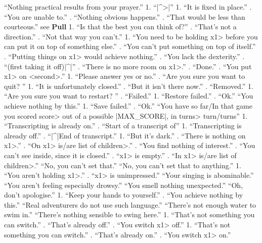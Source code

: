    ``Nothing practical results from your prayer.''
 1. ``|^>|''
  1. ``It is fixed in place.''
. ``You are unable to.''
. ``Nothing obvious happens.''
. ``That would be less than courteous.''
 see {\bf Pull}
 1. ``Is that the best you can think of?''
. ``That's not a direction.''
. ``Not that way you can't.''
  1. ``You need to be holding \<x1> before you
can put it on top of something else.''
. ``You can't put something on top of itself.''
. ``Putting things on \<x1> would achieve nothing.''
. ``You lack the dexterity.''
. ``(first taking it off)|^|''
. ``There is no more room on \<x1>.''
. ``Done.''
. ``You put \<x1> on <second>.''
   1. ``Please answer yes or no.''
. ``Are you sure you want to quit? '' 
  1. ``It is unfortunately closed.''
. ``But it isn't there now.''
. ``Removed.''
 1. ``Are you sure you want to restart? ''
. ``Failed.''
 1. ``Restore failed.''
. ``Ok.''
   ``You achieve nothing by this.''
   1. ``Save failed.''
. ``Ok.''
  ``You have so far/In that game you scored \<score> out of
a possible |MAX_SCORE|, in \<turns> turn/turns''
 1. ``Transcripting is already on.''
. ``Start of a transcript of''
 1. ``Transcripting is already off.''
. ``|^|End of transcript.''
  1. ``But it's dark.''
. ``There is nothing on \<x1>.''
. ``On \<x1> is/are \<list of children>.''
. ``You find nothing of interest.''
. ``You can't see inside, since it is closed.''
. ``\<x1> is empty.''
. ``In \<x1> is/are \<list of children>.''
   ``No, you can't set that.''
  ``No, you can't set that to anything.''
   1. ``You aren't holding \<x1>.''
. ``\<x1> is unimpressed.''
   ``Your singing is abominable.''
  ``You aren't feeling especially drowsy.''
  ``You smell nothing unexpected.''
  ``Oh, don't apologise.''
 1. ``Keep your hands to yourself.''
. ``You achieve nothing by this.''
  ``Real adventurers do not use such language.''
   ``There's not enough water to swim in.''
  ``There's nothing sensible to swing here.''
 1. ``That's not something you can switch.''
. ``That's already off.''
. ``You switch \<x1> off.''
 1. ``That's not something you can switch.''
. ``That's already on.''
. ``You switch \<x1> on.''
